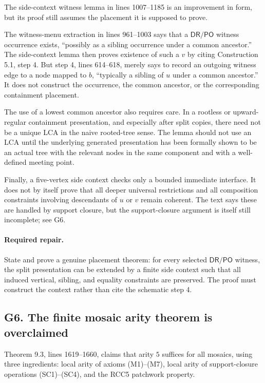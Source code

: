 \documentclass[11pt]{article}
\newcommand{\DR}{\mathsf{DR}}
\newcommand{\PO}{\mathsf{PO}}
\begin{document}
The side-context witness lemma in lines 1007--1185 is an improvement in form,
but its proof still assumes the placement it is supposed to prove.

The witness-menu extraction in lines 961--1003 says that a \(\DR/\PO\) witness
occurrence exists, ``possibly as a sibling occurrence under a common ancestor.''
The side-context lemma then proves existence of such a \(v\) by citing
Construction 5.1, step 4.  But step 4, lines 614--618, merely says to record an
outgoing witness edge to a node mapped to \(b\), ``typically a sibling of \(u\)
under a common ancestor.''  It does not construct the occurrence, the common
ancestor, or the corresponding containment placement.

The use of a lowest common ancestor also requires care.  In a rootless or
upward-regular containment presentation, and especially after split copies,
there need not be a unique LCA in the naive rooted-tree sense.  The lemma should
not use an LCA until the underlying generated presentation has been formally
shown to be an actual tree with the relevant nodes in the same component and
with a well-defined meeting point.

Finally, a five-vertex side context checks only a bounded immediate interface.
It does not by itself prove that all deeper universal restrictions and all
composition constraints involving descendants of \(u\) or \(v\) remain coherent.
The text says these are handled by support closure, but the support-closure
argument is itself still incomplete; see G6.

\paragraph{Required repair.}
State and prove a genuine placement theorem: for every selected \(\DR/\PO\)
witness, the split presentation can be extended by a finite side context such
that all induced vertical, sibling, and equality constraints are preserved.  The
proof must construct the context rather than cite the schematic step 4.

\subsection{G6. The finite mosaic arity theorem is overclaimed}

Theorem 9.3, lines 1619--1660, claims that arity \(5\) suffices for all mosaics,
using three ingredients: local arity of axioms (M1)--(M7), local arity of
support-closure operations (SC1)--(SC4), and the RCC5 patchwork property.
\end{document}
